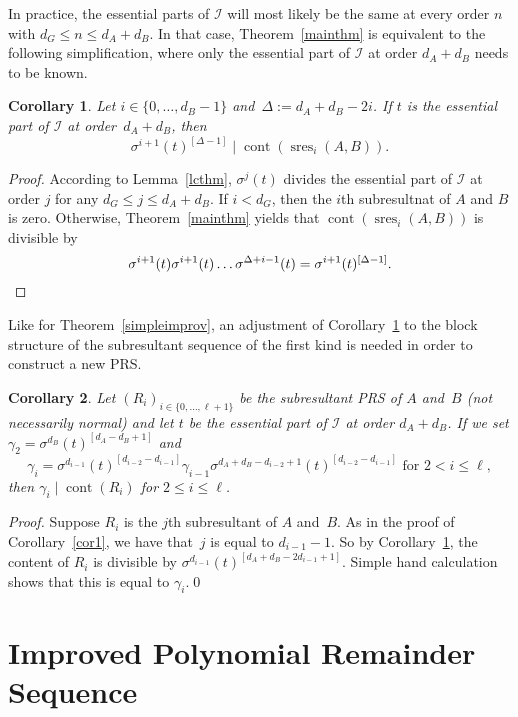 \documentclass[3p,11pt,preprint]{elsarticle}
\newtheorem{corollary}{Corollary}
\newcommand{\cont}{\operatorname{cont}}
\newcommand{\pres}{\operatorname{sres}}
\newcommand{\prs}[3]{(#1_i)_{i\in \{#2,\dots,#3\}}}
\begin{document}
In practice, the essential parts of $\mathcal{I}$ will most likely be the same at every order $n$ with $d_G\leq n\leq d_A+d_B$. In that case, Theorem~\ref{mainthm} is equivalent to the following simplification, where only the essential part of $\mathcal{I}$ at order $d_A+d_B$ needs to be known.

\begin{corollary}
\label{oneespart}
 Let $i\in\{0,\dots,d_B-1\}$ and~$\Delta:=d_A+d_B-2i$. If $t$ is the essential part of $\mathcal{I}$ at order~$d_A+d_B$, then
\[\sigma^{i+1}(t)^{[\Delta-1]}\mid\cont(\pres_i(A,B)).\]
\end{corollary}

\begin{proof}
 According to Lemma~\ref{lcthm}, $\sigma^{j}(t)$ divides the essential part of $\mathcal{I}$ at order $j$ for any $d_G\leq j\leq d_A+d_B$. If $i<d_G$, then the $i$th subresultnat of $A$ and $B$ is zero. Otherwise, Theorem~\ref{mainthm} yields that $\cont(\pres_i(A,B))$ is divisible by 
 \[\sigma^{i+1}(t)\sigma^{i+1}(t)\dots \sigma^{\Delta+i-1}(t) = \sigma^{i+1}(t)^{[\Delta-1]}.\text{\rlap{$\hspace{4.3cm}\square$}}\]
\end{proof}




Like for Theorem~\ref{simpleimprov}, an adjustment of Corollary~\ref{oneespart} to the block structure of the subresultant sequence of the first kind is needed in order to construct a new PRS.

\begin{corollary}
\label{cor2}
 Let $\prs{R}{0}{\ell+1}$ be the subresultant PRS of $A$ and~$B$ (not necessarily normal) and let $t$ be the essential part of $\mathcal{I}$ at order $d_A+d_B$. If we set $\gamma_2 = \sigma^{d_B}(t)^{[d_A-d_B+1]}$ and \[\gamma_i=\sigma^{d_{i-1}}(t)^{[d_{i-2}-d_{i-1}]}\gamma_{i-1}\sigma^{d_A+d_B-d_{i-2}+1}(t)^{[d_{i-2}-d_{i-1}]}\text{ for } 2<i\leq\ell,\] then $\gamma_i\mid\cont(R_i)$ for $2\leq i\leq\ell$.
\end{corollary}
\begin{proof}
 Suppose $R_i$ is the $j$th subresultant of $A$ and~$B$. As in the proof of Corollary~\ref{cor1}, we have that~$j$ is equal to $d_{i-1}-1$. So by Corollary~\ref{oneespart}, the content of $R_i$ is divisible by $\sigma^{d_{i-1}}(t)^{[d_A+d_B-2d_{i-1}+1]}$. Simple hand calculation shows that this is equal to $\gamma_i$.\qed
\end{proof}

\section{Improved Polynomial Remainder Sequence}
\label{improvsec}
\end{document}
